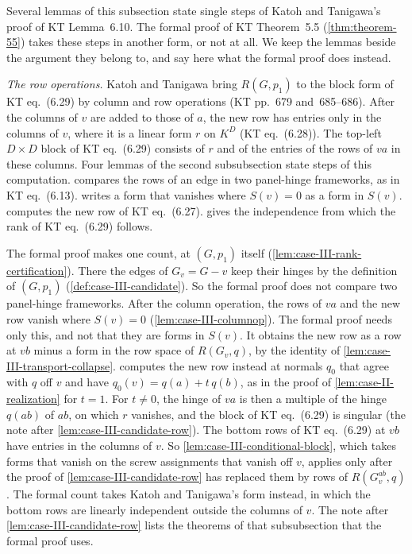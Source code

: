 \begin{remark}
  \label{rem:case-III-kt-steps}
  Several lemmas of this subsection state single steps of Katoh and
  Tanigawa's proof of KT Lemma~6.10. The formal proof of KT Theorem~5.5
  (\cref{thm:theorem-55}) takes these steps in another form, or not at
  all. We keep the lemmas beside the argument they belong to, and say
  here what the formal proof does instead.

  \emph{The row operations.} Katoh and Tanigawa bring $R(G, p_1)$ to the
  block form of KT eq.~(6.29) by column and row operations (KT pp.~679
  and~685--686). After the columns of $v$ are added to those of $a$, the
  new row has entries only in the columns of $v$, where it is a linear
  form $r$ on $K^D$ (KT eq.~(6.28)). The top-left $D \times D$ block of
  KT eq.~(6.29) consists of $r$ and of the entries of the rows of $va$
  in these columns. Four lemmas of the second subsubsection state steps
  of this computation.  compares the rows of an
  edge in two panel-hinge frameworks, as in KT eq.~(6.13).
   writes a form that vanishes
  where $S(v) = 0$ as a form in $S(v)$.
   computes the new row of
  KT eq.~(6.27).  gives the
  independence from which the rank of KT eq.~(6.29) follows.

  The formal proof makes one count, at $(G, p_1)$ itself
  (\cref{lem:case-III-rank-certification}). There the edges of
  $G_v = G - v$ keep their hinges by the definition of $(G, p_1)$
  (\cref{def:case-III-candidate}). So the formal proof does not compare
  two panel-hinge frameworks. After the column operation, the rows of
  $va$ and the new row vanish where $S(v) = 0$
  (\cref{lem:case-III-columnop}). The formal proof needs only this, and
  not that they are forms in $S(v)$. It obtains the new row as a row at
  $vb$ minus a form in the row space of $R(G_v, q)$, by the identity of
  \cref{lem:case-III-transport-collapse}.
   computes the new row
  instead at normals $q_0$ that agree with $q$ off $v$ and have
  $q_0(v) = q(a) + t\,q(b)$, as in the proof of
  \cref{lem:case-II-realization} for $t = 1$. For $t \neq 0$, the hinge
  of $va$ is then a multiple of the hinge $q(ab)$ of $ab$, on which $r$
  vanishes, and the block of KT eq.~(6.29) is singular (the note after
  \cref{lem:case-III-candidate-row}). The bottom rows of KT eq.~(6.29)
  at $vb$ have entries in the columns of $v$. So
  \cref{lem:case-III-conditional-block}, which takes forms that vanish
  on the screw assignments that vanish off $v$, applies only after the
  proof of \cref{lem:case-III-candidate-row} has replaced them by rows of
  $R(G_v^{ab}, q)$. The formal count takes Katoh and Tanigawa's form
  instead, in which the bottom rows are linearly independent outside the
  columns of $v$. The note after \cref{lem:case-III-candidate-row} lists
  the theorems of that subsubsection that the formal proof uses.


\end{remark}
